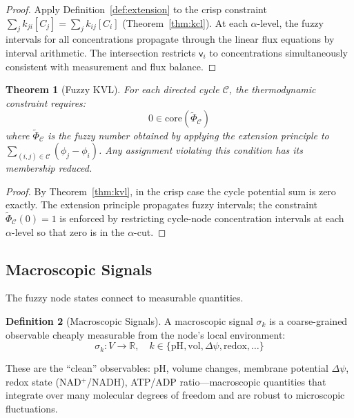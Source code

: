 \documentclass[10pt,twocolumn,a4paper]{article}
\theoremstyle{plain}
\newtheorem{theorem}{Theorem}[section]
\theoremstyle{definition}
\newtheorem{definition}[theorem]{Definition}
\theoremstyle{remark}
\newcommand{\fnode}{\mathsf{v}}
\newcommand{\sig}{\sigma}
\newcommand{\R}{\mathbb{R}}
\begin{document}
\begin{proof}
Apply Definition~\ref{def:extension} to the crisp constraint $\sum_j k_{ji}[C_j] = \sum_j k_{ij}[C_i]$ (Theorem~\ref{thm:kcl}). At each $\alpha$-level, the fuzzy intervals for all concentrations propagate through the linear flux equations by interval arithmetic. The intersection restricts $\fnode_i$ to concentrations simultaneously consistent with measurement and flux balance.
\end{proof}

\begin{theorem}[Fuzzy KVL]
\label{thm:fuzzy_kvl}
For each directed cycle $\mathcal{C}$, the thermodynamic constraint requires:
\begin{equation}
    0 \in \mathrm{core}\!\left(\widetilde{\Phi}_{\mathcal{C}}\right)
    \label{eq:fuzzy_kvl}
\end{equation}
where $\widetilde{\Phi}_{\mathcal{C}}$ is the fuzzy number obtained by applying the extension principle to $\sum_{(i,j) \in \mathcal{C}} (\phi_j - \phi_i)$. Any assignment violating this condition has its membership reduced.
\end{theorem}

\begin{proof}
By Theorem~\ref{thm:kvl}, in the crisp case the cycle potential sum is zero exactly. The extension principle propagates fuzzy intervals; the constraint $\widetilde{\Phi}_{\mathcal{C}}(0) = 1$ is enforced by restricting cycle-node concentration intervals at each $\alpha$-level so that zero is in the $\alpha$-cut.
\end{proof}

\subsection{Macroscopic Signals}

The fuzzy node states connect to measurable quantities.

\begin{definition}[Macroscopic Signals]
\label{def:signals}
A macroscopic signal $\sig_k$ is a coarse-grained observable cheaply measurable from the node's local environment:
\begin{equation}
    \sig_k: V \to \R, \quad k \in \{\text{pH}, \text{vol}, \Delta\psi, \text{redox}, \ldots\}
\end{equation}
\end{definition}

These are the ``clean'' observables: pH, volume changes, membrane potential $\Delta\psi$, redox state (NAD$^+$/NADH), ATP/ADP ratio---macroscopic quantities that integrate over many molecular degrees of freedom and are robust to microscopic fluctuations.
\end{document}
